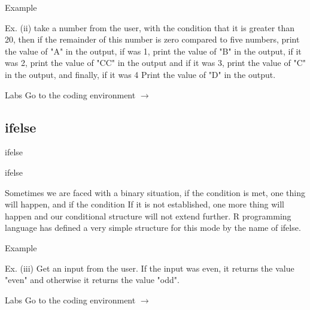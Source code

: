 \documentclass{beamer}\usepackage[]{graphicx}\usepackage[]{xcolor}
\begin{document}
\begin{frame}{Example}
\begin{exampleblock}{Ex. (ii)}
take a number from the user, with the condition that it is greater than 20, then if the remainder of this number is zero compared to five numbers, print the value of "A" in the output, if
    was 1, print the value of "B" in the output, if it was 2, print the value of "CC" in the output and if it was 3, print the value of "C" in the output, and finally, if it was 4
    Print the value of "D" in the output.
\end{exampleblock}
\end{frame}


\begin{frame}{Labs}
    \alert{{\Large Go to the coding environment $\rightarrow$}}
\end{frame}






\subsection{ifelse}

\begin{frame}{ifelse}

    \begin{block}{ifelse}
        
    
Sometimes we are faced with a binary situation, if the condition is met, one thing will happen, and if the condition
    If it is not established, one more thing will happen and our conditional structure will not extend further.
    R programming language has defined a very simple structure for this mode
    by the name of ifelse. 
\end{block}
\end{frame}



\begin{frame}{Example}
\begin{exampleblock}{Ex. (iii)}
Get an input from the user. If the input was even, it returns the value "even" and otherwise it returns the value "odd".
\end{exampleblock}
\end{frame}







\begin{frame}{Labs}
    \alert{{\Large Go to the coding environment $\rightarrow$}}
    \end{frame}
\end{document}
